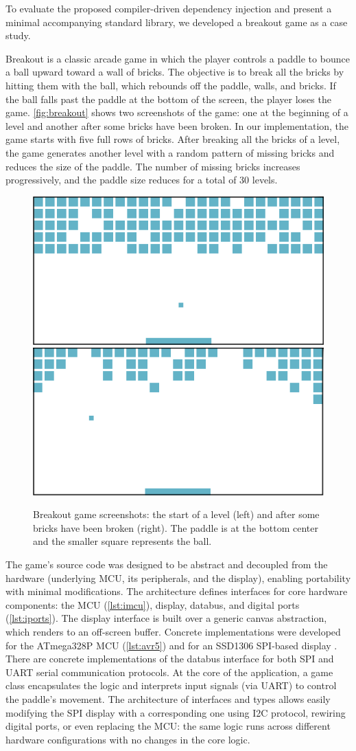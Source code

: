 \documentclass[10pt,sigplan,screen,anonymous]{acmart}
\begin{document}
To evaluate the proposed compiler-driven dependency injection and present a minimal accompanying standard library, we developed a breakout game as a case study.

Breakout is a classic arcade game in which the player controls a paddle to bounce a ball upward toward a wall of bricks. The objective is to break all the bricks by hitting them with the ball, which rebounds off the paddle, walls, and bricks. If the ball falls past the paddle at the bottom of the screen, the player loses the game. \autoref{fig:breakout} shows two screenshots of the game: one at the beginning of a level and another after some bricks have been broken. In our implementation, the game starts with five full rows of bricks. After breaking all the bricks of a level, the game generates another level with a random pattern of missing bricks and reduces the size of the paddle. The number of missing bricks increases progressively, and the paddle size reduces for a total of 30 levels. 

\begin{figure}[tp]
\includegraphics[width=.23\textwidth]{breakout1}\hspace{5pt}\includegraphics[width=.23\textwidth]{breakout2}
\caption{Breakout game screenshots: the start of a level (left) and after some bricks have been broken (right). The paddle is at the bottom center and the smaller square represents the ball.}
\label{fig:breakout}
\end{figure}

The game's source code was designed to be abstract and decoupled from the hardware (underlying MCU, its peripherals, and the display), enabling portability with minimal modifications. The architecture defines interfaces for core hardware components: the MCU (\autoref{lst:imcu}), display, databus, and digital ports (\autoref{lst:iports}). The display interface is built over a generic canvas abstraction, which renders to an off-screen buffer. Concrete implementations were developed for the ATmega328P MCU \cite{atmel328p} (\autoref{lst:avr5}) and for an SSD1306 SPI-based display \cite{ssd1306}. There are concrete implementations of the databus interface for both SPI and UART serial communication protocols. At the core of the application, a game class encapsulates the logic and interprets input signals (via UART) to control the paddle’s movement. The architecture of interfaces and types allows easily modifying the SPI display with a corresponding one using I2C protocol, rewiring digital ports, or even replacing the MCU: the same logic runs across different hardware configurations with no changes in the core logic.
\end{document}
